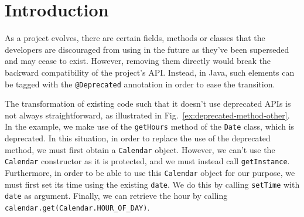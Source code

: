 \documentclass[conference]{IEEEtran}
\begin{document}






\section{Introduction}\label{sec:intro}







As a project evolves, there are certain fields, methods or classes
that the developers are discouraged from using in the future as
they've been superseded and may cease to exist.
However, removing them directly would break the backward compatibility
of the project's API.  Instead, in Java, such elements can be tagged with the
\lstinline[breaklines=true]{@Deprecated} annotation in order to ease the transition.


The transformation of existing code such that it doesn't use
deprecated APIs is not always straightforward, as illustrated in
Fig.~\ref{ex:deprecated-method-other}. In the example, we make use of
the \lstinline[breaklines=true]{getHours} method of the \lstinline[breaklines=true]{Date} class, which is
deprecated.  In this situation, in order to replace the use of the
deprecated method, we must first obtain a \lstinline[breaklines=true]{Calendar} object.
However, we can't use the \lstinline[breaklines=true]{Calendar} constructor as it is
protected, and we must instead call \lstinline[breaklines=true]{getInstance}.
Furthermore, in order to be able to use this \lstinline[breaklines=true]{Calendar} object
for our purpose, we must first set its time using the existing
\lstinline[breaklines=true]{date}.  We do this by calling \lstinline[breaklines=true]{setTime} with
\lstinline[breaklines=true]{date} as argument.  Finally, we can retrieve the hour by
calling \lstinline[breaklines=true]{calendar.get(Calendar.HOUR_OF_DAY)}.
\end{document}
